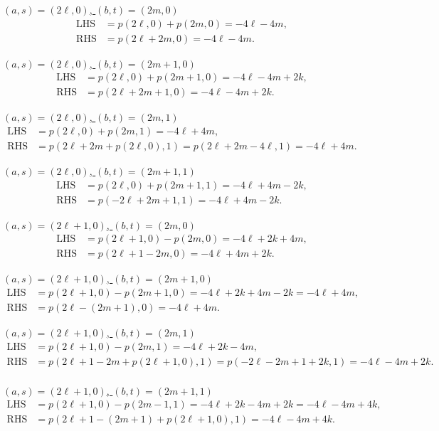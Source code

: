 \documentclass[12pt]{amsart}
\theoremstyle{definition}
\begin{document}
{\tiny
\noindent\underline{$(a,s)=(2\ell,0)$, $(b,t)=(2m,0)$}
\begin{align*}
  \text{LHS} &= p(2\ell,0)+p(2m,0)=-4\ell-4m,\\
  \text{RHS} &= p(2\ell+2m,0)=-4\ell-4m.
\end{align*}

\noindent\underline{$(a,s)=(2\ell,0)$, $(b,t)=(2m+1,0)$}
\begin{align*}
  \text{LHS} &= p(2\ell,0)+p(2m+1,0)=-4\ell-4m+2k,\\
  \text{RHS} &= p(2\ell+2m+1,0)=-4\ell-4m+2k.
\end{align*}

\noindent\underline{$(a,s)=(2\ell,0)$, $(b,t)=(2m,1)$}
\begin{align*}
  \text{LHS} &= p(2\ell,0)+p(2m,1)=-4\ell+4m,\\
  \text{RHS} &= p(2\ell+2m+p(2\ell,0),1)=p(2\ell+2m-4\ell,1)=-4\ell+4m.
\end{align*}

\noindent\underline{$(a,s)=(2\ell,0)$, $(b,t)=(2m+1,1)$}
\begin{align*}
  \text{LHS} &= p(2\ell,0)+p(2m+1,1)=-4\ell+4m-2k,\\
  \text{RHS} &= p(-2\ell+2m+1,1)=-4\ell+4m-2k.
\end{align*}

\noindent\underline{$(a,s)=(2\ell+1,0)$, $(b,t)=(2m,0)$}
\begin{align*}
  \text{LHS} &= p(2\ell+1,0)-p(2m,0)=-4\ell+2k+4m,\\
  \text{RHS} &= p(2\ell+1-2m,0)=-4\ell+4m+2k.
\end{align*}

\noindent\underline{$(a,s)=(2\ell+1,0)$, $(b,t)=(2m+1,0)$}
\begin{align*}
  \text{LHS} &= p(2\ell+1,0)-p(2m+1,0)=-4\ell+2k+4m-2k=-4\ell+4m,\\
  \text{RHS} &= p(2\ell-(2m+1),0)=-4\ell+4m.
\end{align*}

\noindent\underline{$(a,s)=(2\ell+1,0)$, $(b,t)=(2m,1)$}
\begin{align*}
  \text{LHS} &= p(2\ell+1,0)-p(2m,1)=-4\ell+2k-4m,\\
  \text{RHS} &= p(2\ell+1-2m+p(2\ell+1,0),1)
  =p(-2\ell-2m+1+2k,1)=-4\ell-4m+2k.\\
\end{align*}

\noindent\underline{$(a,s)=(2\ell+1,0)$, $(b,t)=(2m+1,1)$}
\begin{align*}
  \text{LHS} &= p(2\ell+1,0)-p(2m-1,1)=-4\ell+2k-4m+2k=-4\ell-4m+4k,\\
  \text{RHS} &= p(2\ell+1-(2m+1)+p(2\ell+1,0),1)=-4\ell-4m+4k.
\end{align*}

}
\end{document}
